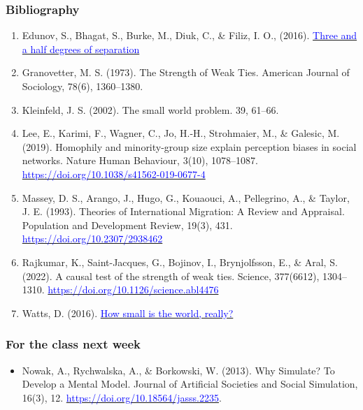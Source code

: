 \documentclass{beamer}
\begin{document}
\begin{frame}
   \frametitle{Bibliography}
   \footnotesize
   \begin{enumerate}
      \item Edunov, S., Bhagat, S., Burke, M., Diuk, C., \& Filiz, I. O., (2016). \href{https://research.facebook.com/blog/2016/2/three-and-a-half-degrees-of-separation/}{\textcolor{blue}{Three and a half degrees of separation}}
      \item Granovetter, M. S. (1973). The Strength of Weak Ties. American
      Journal of Sociology, 78(6), 1360–1380.
      \item Kleinfeld, J. S. (2002). The small world problem. 39, 61–66.
      \item Lee, E., Karimi, F., Wagner, C., Jo, H.-H., Strohmaier, M., \&
      Galesic, M. (2019). Homophily and minority-group size explain perception
      biases in social networks. Nature Human Behaviour, 3(10), 1078–1087.
      \href{https://doi.org/10.1038/s41562-019-0677-4}{\textcolor{blue}{https://doi.org/10.1038/s41562-019-0677-4}}
      \item Massey, D. S., Arango, J., Hugo, G., Kouaouci, A., Pellegrino, A.,
      \& Taylor, J. E. (1993). Theories of International Migration: A Review and
      Appraisal. Population and Development Review, 19(3), 431.
      \href{https://doi.org/10.2307/2938462}{\textcolor{blue}{https://doi.org/10.2307/2938462}}
      \item Rajkumar, K., Saint-Jacques, G., Bojinov, I., Brynjolfsson, E., \&
      Aral, S. (2022). A causal test of the strength of weak ties. Science,
      377(6612), 1304–1310. \href{https://doi.org/10.1126/science.abl4476}{\textcolor{blue}{https://doi.org/10.1126/science.abl4476}}
      \item Watts, D. (2016). \href{https://medium.com/@duncanjwatts/how-small-is-the-world-really-736fa21808ba}{\textcolor{blue}{How small is the world, really?}}
   \end{enumerate}
\end{frame}

\begin{frame}
    \frametitle{For the class next week}
    \begin{itemize}
        \item Nowak, A., Rychwalska, A., \& Borkowski, W. (2013). Why Simulate?
        To Develop a Mental Model. Journal of Artificial Societies and Social
        Simulation, 16(3), 12.
        \href{https://doi.org/10.18564/jasss.2235}{\textcolor{blue}{https://doi.org/10.18564/jasss.2235}}.
    \end{itemize}
\end{frame}
\end{document}
